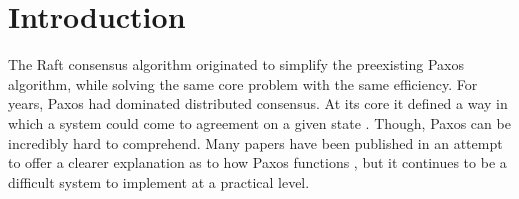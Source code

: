 \section{Introduction}

The Raft consensus algorithm originated to simplify the preexisting Paxos algorithm, while solving the same core problem \cite{OngaroRaft} with the same efficiency. For years, Paxos had dominated distributed consensus. At its core it defined a way in which a system could come to agreement on a given state \cite{LamportPPT}. Though, Paxos can be incredibly hard to comprehend. Many papers have been published in an attempt to offer a clearer explanation as to how Paxos functions \cite{LamportSimple, MazieresPractical}, but it continues to be a difficult system to implement at a practical level.